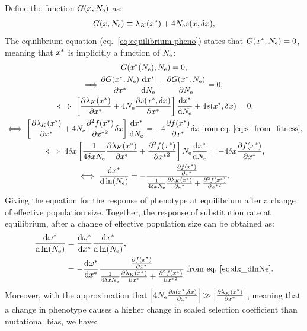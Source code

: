 Define the function $G(x, N_{\text{e}} )$ as:
\begin{gather}
    G(x, N_{\text{e}} ) \equiv \lambda_K (x^{*}) + 4 N_{\text{e}} s(x, \delta x),
\end{gather}
The equilibrium equation (eq.~\ref{eq:equilibrium-pheno}) states that $G(x^{*}, N_{\text{e}} )=0$, meaning that $x^{*}$ is implicitly a function of $N_{\text{e}}$:
\begin{gather}
    G(x^{*}(N_{\text{e}}), N_{\text{e}} ) = 0, \\
    \Longrightarrow \frac{\partial G(x^{*}, N_{\text{e}} ) }{\partial x^{*} }\frac{ \text{d} x^{*}}{\text{d} N_{\text{e}}} + \frac{ \partial G(x^{*}, N_{\text{e}} )}{\partial N_{\text{e}}} = 0, \\
    \iff \left[  \frac{\partial \lambda_K (x^{*}) }{\partial x^{*} }  + 4 N_{\text{e}} \frac{ \partial s(x^{*}, \delta x) }{\partial x^{*} } \right]\frac{ \text{d} x^{*}}{\text{d} N_{\text{e}}} + 4 s(x^{*}, \delta x) = 0, \\
    \iff \left[  \frac{\partial \lambda_K (x^{*}) }{\partial x^{*} } + 4 N_{\text{e}} \frac{ \partial^2 f (x^{*}) }{\partial {x^{*}}^2}\delta x \right]\frac{ \text{d} x^{*}}{\text{d} N_{\text{e}}}  = - 4 \frac{ \partial f (x^{*}) }{\partial {x^{*}}}\delta x \text{ from eq.~\ref{eq:s_from_fitness}}, \\
    \iff 4 \delta x \left[ \frac{1}{4 \delta x N_{\text{e}} } \frac{\partial \lambda_K (x^{*}) }{\partial x^{*} } + \frac{ \partial^2 f (x^{*}) }{\partial {x^{*}}^2} \right] N_{\text{e}} \frac{ \text{d} x^{*}}{\text{d} N_{\text{e}}}  = - 4 \delta x \frac{ \partial f (x^{*}) }{\partial {x^{*}}}, \\
    \iff \frac{ \text{d} x^{*}}{\text{d} \ln (N_{\text{e}})}  = - \frac{\frac{ \partial f (x^{*}) }{\partial {x^{*}}}}{\frac{1}{4 \delta x N_{\text{e}}} \frac{\partial \lambda_K (x^{*}) }{\partial x^{*} } + \frac{ \partial^2 f (x^{*}) }{\partial {x^{*}}^2}}  \label{eq:dx_dlnNe}.
\end{gather}
Giving the equation for the response of phenotype at equilibrium after a change of effective population size.
Together, the response of substitution rate at equilibrium, after a change of effective population size can be obtained as:
\begin{align}
    \frac{\text{d} \omega^{*}}{\text{d} \ln (N_{\text{e}})} & = \frac{\text{d} \omega^{*}}{\text{d} x^{*}} \frac{ \text{d} x^{*}}{\text{d} \ln (N_{\text{e}})}, \\
    &= - \frac{\text{d} \omega^{*}}{\text{d} x^{*}} \frac{\frac{ \partial f (x^{*}) }{\partial {x^{*}}}}{\frac{1}{4 \delta x N_{\text{e}} } \frac{\partial \lambda_K (x^{*}) }{\partial x^{*} } + \frac{ \partial^2 f (x^{*}) }{\partial {x^{*}}^2}} \text{ from eq.~\ref{eq:dx_dlnNe}} \label{eq:dw_dlnNe}.
\end{align}
Moreover, with the approximation that $\left| 4 N_{\text{e}} \frac{ \partial s(x^{*}, \delta x) }{\partial x^{*} } \right| \gg \left| \frac{\partial \lambda_K (x^{*}) }{\partial x^{*} } \right|$, meaning that a change in phenotype causes a higher change in scaled selection coefficient than mutational bias, we have:
